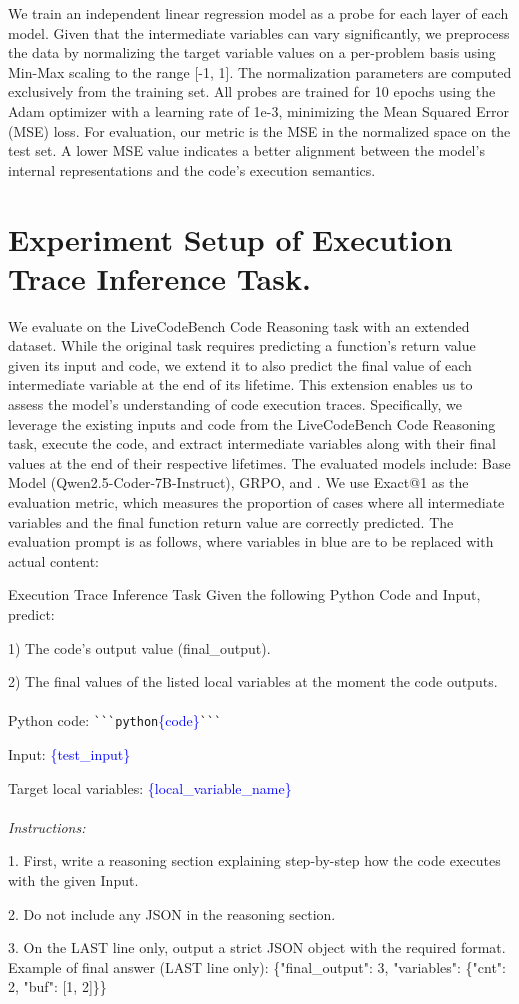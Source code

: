 We train an independent linear regression model as a probe for each layer of each model. Given that the intermediate variables can vary significantly, we preprocess the data by normalizing the target variable values on a per-problem basis using Min-Max scaling to the range [-1, 1]. The normalization parameters are computed exclusively from the training set. All probes are trained for 10 epochs using the Adam optimizer with a learning rate of 1e-3, minimizing the Mean Squared Error (MSE) loss. For evaluation, our metric is the MSE in the normalized space on the test set. A lower MSE value indicates a better alignment between the model's internal representations and the code's execution semantics.

\section{Experiment Setup of Execution Trace Inference Task.}

We evaluate on the LiveCodeBench Code Reasoning task with an extended dataset. While the original task requires predicting a function's return value given its input and code, we extend it to also predict the final value of each intermediate variable at the end of its lifetime. This extension enables us to assess the model's understanding of code execution traces.
Specifically, we leverage the existing inputs and code from the LiveCodeBench Code Reasoning task, execute the code, and extract intermediate variables along with their final values at the end of their respective lifetimes.
The evaluated models include: Base Model (Qwen2.5-Coder-7B-Instruct), GRPO, and \ourapproach.
We use Exact@1 as the evaluation metric, which measures the proportion of cases where all intermediate variables and the final function return value are correctly predicted.
The evaluation prompt is as follows, where variables in blue are to be replaced with actual content:

\begin{promptbox}{Execution Trace Inference Task}
Given the following Python Code and Input, predict:

1) The code's output value (final\_output).

2) The final values of the listed local variables at the moment the code outputs.
\\\\
Python code: \verb|```python|\textcolor{blue}{\{code\}}\verb|```|

Input: \textcolor{blue}{\{test\_input\}}

Target local variables: \textcolor{blue}{\{local\_variable\_name\}}
\\\\
\textit{Instructions:}

1. First, write a reasoning section explaining step-by-step how the code executes with the given Input.

2. Do not include any JSON in the reasoning section.

3. On the LAST line only, output a strict JSON object with the required format. Example of final answer (LAST line only):
\{"final\_output": 3, "variables": \{"cnt": 2, "buf": [1, 2]\}\}
\end{promptbox}

